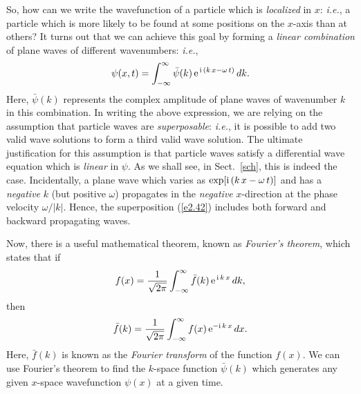 So, how can we write the wavefunction of a particle which is {\em localized}\/
in $x$: {\em i.e.}, a particle which is more likely to be found at some
positions on the $x$-axis than at others? It turns out that we can achieve this goal by forming
a {\em linear combination}\/ of plane waves of different wavenumbers:
{\em i.e.}, 
\begin{equation}\label{e2.42}
\psi(x,t) = \int_{-\infty}^{\infty} \bar{\psi}(k)\,{\rm e}^{\,{\rm i}\,(k\,x-\omega\,t)}\,dk.
\end{equation}
Here, $\bar{\psi}(k)$ represents the complex amplitude of plane waves of wavenumber $k$ in this combination. In writing the above expression,
we are relying on the assumption that particle waves are  {\em superposable}:
{\em i.e.}, it is possible to add two valid wave solutions to form a third valid wave solution.
The ultimate justification for this assumption is that particle waves
satisfy a differential wave equation which is {\em linear}\/ in $\psi$. As we
shall see, in Sect.~\ref{sch}, this is indeed the case. Incidentally, a plane wave which varies as
$\exp[{\rm i}\,(k\,x-\omega\,t)]$ and has a {\em negative}\/ $k$  (but positive $\omega$) propagates
in the {\em negative}\/ $x$-direction at the phase velocity $\omega/|k|$. Hence, the superposition (\ref{e2.42})
includes both forward and backward propagating waves. 

Now, there is a useful mathematical theorem, known as {\em Fourier's theorem}, which states that if
\begin{equation}\label{e2.43}
f(x) = \frac{1}{\sqrt{2\pi}}\int_{-\infty}^{\infty} \bar{f}(k)\,{\rm e}^{\,{\rm i}\,k\,x}\,dk,
\end{equation}
then
\begin{equation}\label{e2.44}
\bar{f}(k) = \frac{1}{\sqrt{2\pi}}\int_{-\infty}^\infty f(x)\,{\rm e}^{-{\rm i}\,k\,x}\,dx.
\end{equation}
Here, $\bar{f}(k)$ is known as the {\em Fourier transform}\/ of the
function $f(x)$. We can use Fourier's theorem to find the $k$-space function $\bar{\psi}(k)$ which generates any given $x$-space wavefunction $\psi(x)$
at a given time.

